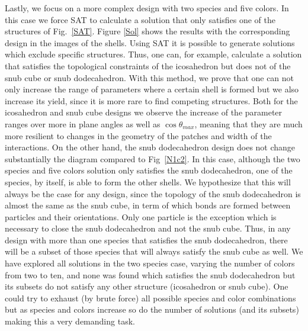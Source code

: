 \documentclass[a4paper, amsfonts, amssymb, amsmath, reprint, showkeys, nofootinbib, twoside]{revtex4-1}
\begin{document}
Lastly, we focus on a more complex design with two species and five colors. In this case we force SAT to calculate a solution that only satisfies one of the structures of Fig.~\ref{SAT}. Figure \ref{Sol} shows the results with the corresponding design in the images of the shells. Using SAT it is possible to generate solutions which exclude specific structures. Thus, one can, for example, calculate a solution that satisfies the topological constraints of the icosahedron but does not of the snub cube or snub dodecahedron. With this method, we prove that one can not only increase the range of parameters where a certain shell is formed but we also increase its yield, since it is more rare to find competing structures. Both for the icosahedron and snub cube designs we observe the increase of the parameter ranges over more in plane angles as well as $\cos\theta_{max}$, meaning that they are much more resilient to changes in the geometry of the patches and width of the interactions. On the other hand, the snub dodecahedron design does not change substantially the diagram compared to Fig~\ref{N1c2}. In this case, although the two species and five colors solution only satisfies the snub dodecahedron, one of the species, by itself, is able to form the other shells. We hypothesize that this will always be the case for any design, since the topology of the snub dodecahedron is almost the same as the snub cube, in term of which bonds are formed between particles and their orientations. Only one particle is the exception which is necessary to close the snub dodecahedron and not the snub cube. Thus, in any design with more than one species that satisfies the snub dodecahedron, there will be a subset of those species that will always satisfy the snub cube as well. We have explored all solutions in the two species case, varying the number of colors from two to ten, and none was found which satisfies the snub dodecahedron but its subsets do not satisfy any other structure (icosahedron or snub cube). One could try to exhaust (by brute force) all possible species and color combinations but as species and colors increase so do the number of solutions (and its subsets) making this a very demanding task.
\end{document}
